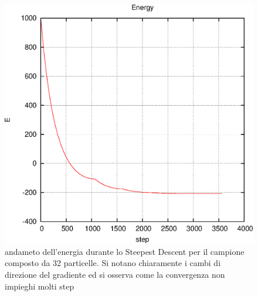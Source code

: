 \documentclass[a4paper,11pt]{article}
\begin{document}
			\begin{figure}[H]
					\centering
					\includegraphics[scale = 0.7]{E_SD_32.eps}
					\caption{andameto dell'energia durante lo Steepest Descent per il campione composto da 32 particelle. Si notano chiaramente i cambi di direzione del gradiente ed si osserva come la convergenza non impieghi molti step}
					\label{fig:SD_32}
				\end{figure}	
\end{document}
